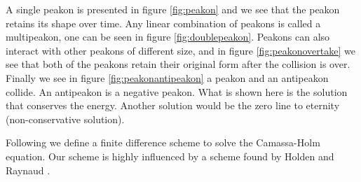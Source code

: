 A single peakon is presented in figure \ref{fig:peakon} and we see that the peakon retains its shape over time. Any linear combination of peakons is called a multipeakon, one can be seen in figure \ref{fig:doublepeakon}. Peakons can also interact with other peakons of different size, and in figure \ref{fig:peakonovertake} we see that both of the peakons retain their original form after the collision is over. Finally we see in figure \ref{fig:peakonantipeakon} a peakon and an antipeakon collide. An antipeakon is a negative peakon. What is shown here is the solution that conserves the energy. Another solution would be the zero line to eternity (non-conservative solution).

Following we define a finite difference scheme to solve the Camassa-Holm equation. Our scheme is highly influenced by a scheme found by Holden and Raynaud \cite{holden2006convergence}.
